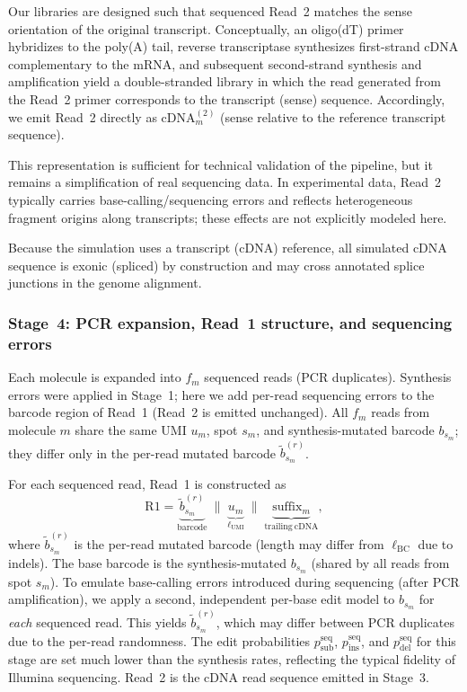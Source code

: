 Our libraries are designed such that sequenced Read~2 matches the sense orientation of the original transcript.
Conceptually, an oligo(dT) primer hybridizes to the poly(A) tail, reverse transcriptase synthesizes first-strand cDNA complementary to the mRNA, and subsequent second-strand synthesis and amplification yield a double-stranded library in which the read generated from the Read~2 primer corresponds to the transcript (sense) sequence.
Accordingly, we emit Read~2 directly as $\mathrm{cDNA}^{(2)}_m$ (sense relative to the reference transcript sequence).

This representation is sufficient for technical validation of the pipeline, but it remains a simplification of real sequencing data. In experimental data, Read~2 typically carries base-calling/sequencing errors and reflects heterogeneous fragment origins along transcripts; these effects are not explicitly modeled here.

Because the simulation uses a transcript (cDNA) reference, all simulated cDNA sequence is exonic (spliced) by construction and may cross annotated splice junctions in the genome alignment.

\subsubsection*{Stage~4: PCR expansion, Read~1 structure, and sequencing errors}

Each molecule is expanded into $f_m$ sequenced reads (PCR duplicates). Synthesis errors were applied in Stage~1; here we add per-read sequencing errors to the barcode region of Read~1 (Read~2 is emitted unchanged). All $f_m$ reads from molecule $m$ share the same UMI $u_m$, spot $s_m$, and synthesis-mutated barcode $b_{s_m}$; they differ only in the per-read mutated barcode $\tilde{b}_{s_m}^{(r)}$.

For each sequenced read, Read~1 is constructed as
\begin{equation}
\mathrm{R1} =
\underbrace{\tilde{b}_{s_m}^{(r)}}_{\mathrm{barcode}}
\;\|\;
\underbrace{u_m}_{\ell_{\mathrm{UMI}}}
\;\|\;
\underbrace{\mathrm{suffix}_m}_{\mathrm{trailing\ cDNA}},
\end{equation}
where $\tilde{b}_{s_m}^{(r)}$ is the per-read mutated barcode (length may differ from $\ell_{\mathrm{BC}}$ due to indels). The base barcode is the synthesis-mutated $b_{s_m}$ (shared by all reads from spot $s_m$). To emulate base-calling errors introduced during sequencing (after PCR amplification), we apply a second, independent per-base edit model to $b_{s_m}$ for \emph{each} sequenced read. This yields $\tilde{b}_{s_m}^{(r)}$, which may differ between PCR duplicates due to the per-read randomness. The edit probabilities $p_{\mathrm{sub}}^{\mathrm{seq}}$, $p_{\mathrm{ins}}^{\mathrm{seq}}$, and $p_{\mathrm{del}}^{\mathrm{seq}}$ for this stage are set much lower than the synthesis rates, reflecting the typical fidelity of Illumina sequencing.
Read~2 is the cDNA read sequence emitted in Stage~3.


